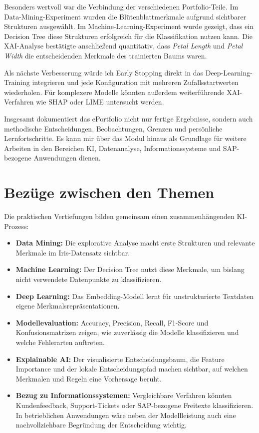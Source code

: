 \documentclass[12pt,a4paper]{article}
\begin{document}
Besonders wertvoll war die Verbindung der verschiedenen
Portfolio-Teile. Im Data-Mining-Experiment wurden die
Blütenblattmerkmale aufgrund sichtbarer Strukturen ausgewählt. Im
Machine-Learning-Experiment wurde gezeigt, dass ein Decision Tree
diese Strukturen erfolgreich für die Klassifikation nutzen kann. Die
XAI-Analyse bestätigte anschließend quantitativ, dass
\textit{Petal Length} und \textit{Petal Width} die entscheidenden
Merkmale des trainierten Baums waren.

Als nächste Verbesserung würde ich Early Stopping direkt in das
Deep-Learning-Training integrieren und jede Konfiguration mit
mehreren Zufallsstartwerten wiederholen. Für komplexere Modelle
könnten außerdem weiterführende XAI-Verfahren wie SHAP oder LIME
untersucht werden.

Insgesamt dokumentiert das ePortfolio nicht nur fertige Ergebnisse,
sondern auch methodische Entscheidungen, Beobachtungen, Grenzen und
persönliche Lernfortschritte. Es kann mir über das Modul hinaus als
Grundlage für weitere Arbeiten in den Bereichen KI, Datenanalyse,
Informationssysteme und SAP-bezogene Anwendungen dienen.
\section{Bezüge zwischen den Themen}

Die praktischen Vertiefungen bilden gemeinsam einen
zusammenhängenden KI-Prozess:

\begin{itemize}
    \item \textbf{Data Mining:}
    Die explorative Analyse macht erste Strukturen und relevante
    Merkmale im Iris-Datensatz sichtbar.

    \item \textbf{Machine Learning:}
    Der Decision Tree nutzt diese Merkmale, um bislang nicht
    verwendete Datenpunkte zu klassifizieren.

    \item \textbf{Deep Learning:}
    Das Embedding-Modell lernt für unstrukturierte Textdaten eigene
    Merkmalsrepräsentationen.

    \item \textbf{Modellevaluation:}
    Accuracy, Precision, Recall, F1-Score und Konfusionsmatrizen
    zeigen, wie zuverlässig die Modelle klassifizieren und welche
    Fehlerarten auftreten.

    \item \textbf{Explainable AI:}
    Der visualisierte Entscheidungsbaum, die Feature Importance und
    der lokale Entscheidungspfad machen sichtbar, auf welchen
    Merkmalen und Regeln eine Vorhersage beruht.

    \item \textbf{Bezug zu Informationssystemen:}
    Vergleichbare Verfahren könnten Kundenfeedback, Support-Tickets
    oder SAP-bezogene Freitexte klassifizieren. In betrieblichen
    Anwendungen wäre neben der Modellleistung auch eine
    nachvollziehbare Begründung der Entscheidung wichtig.
\end{itemize}
\end{document}

